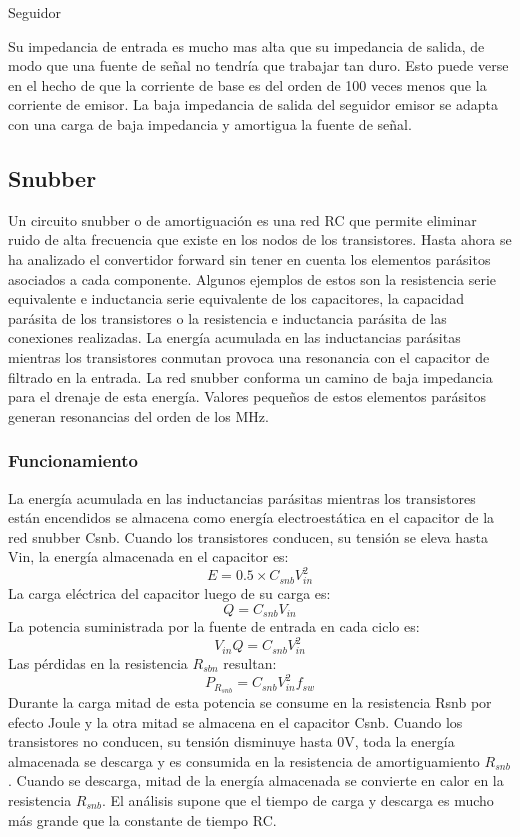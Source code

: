 Seguidor

Su impedancia de entrada es mucho mas alta que su impedancia de salida, de modo que una fuente de señal no tendría que trabajar tan duro.
 Esto puede verse en el hecho de que la corriente de base es del orden de 100 veces menos que la corriente de emisor. 
 La baja impedancia de salida del seguidor emisor se adapta con una carga de baja impedancia y amortigua la fuente de señal.

\subsection{Snubber}

Un circuito snubber o de amortiguación es una red RC que permite eliminar ruido de alta frecuencia que existe en los nodos de los transistores.
Hasta ahora se ha analizado el convertidor forward sin tener en cuenta los elementos parásitos asociados a cada componente. 
Algunos ejemplos de estos son la resistencia serie equivalente e inductancia serie equivalente de los capacitores, 
la capacidad parásita de los transistores o la resistencia e inductancia parásita de las conexiones realizadas. 
La energía acumulada en las inductancias parásitas mientras los transistores conmutan provoca una resonancia con el capacitor de filtrado en la entrada. 
La red snubber conforma un camino de baja impedancia para el drenaje de esta energía. 
Valores pequeños de estos elementos parásitos generan resonancias del orden de los MHz. 

\subsubsection{Funcionamiento}

La energía acumulada en las inductancias parásitas mientras los transistores están encendidos se almacena como energía electroestática en el capacitor de la red snubber Csnb. 
Cuando los transistores conducen, su tensión se eleva hasta Vin, la energía almacenada en el capacitor es: 
$$ E=0.5\times C_{snb}V_{in}^{2} $$
La carga eléctrica del capacitor luego de su carga es:
$$ Q=C_{snb}V_{in} $$
La potencia suministrada por la fuente de entrada en cada ciclo es:
$$ V_{in}Q=C_{snb}V_{in}^{2} $$
Las pérdidas en la resistencia $R_{sbn}$ resultan:
$$ P_{R_{snb}}=C_{snb}V_{in}^{2}f_{sw} $$
Durante la carga mitad de esta potencia se consume en la resistencia Rsnb por efecto Joule y la otra mitad se almacena en el capacitor Csnb. 
Cuando los transistores no conducen, su tensión disminuye hasta 0V, toda la energía almacenada se descarga y es consumida en la resistencia de amortiguamiento $R_{snb}$.
Cuando se descarga, mitad de la energía almacenada se convierte en calor en la resistencia $R_{snb}$. 
El análisis supone que el tiempo de carga y descarga es mucho más grande que la constante de tiempo RC. 

